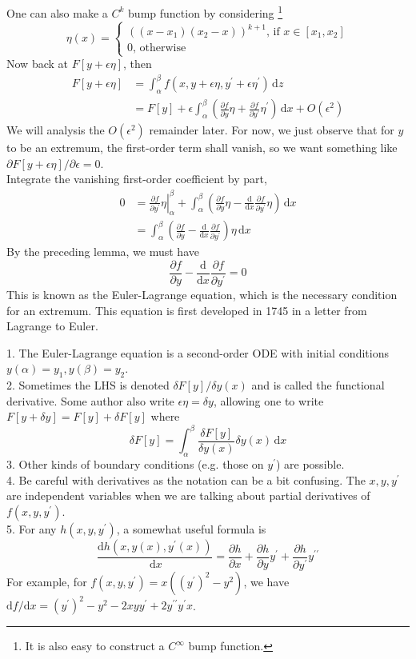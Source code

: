 One can also make a $C^k$ bump function by considering
\footnote{It is also easy to construct a $C^{\infty}$ bump function.}
$$\eta(x)=\begin{cases}
    ((x-x_1)(x_2-x))^{k+1}\text{, if $x\in [x_1,x_2]$}\\
    0\text{, otherwise}
\end{cases}$$
Now back at $F[y+\epsilon\eta]$, then
\begin{align*}
    F[y+\epsilon\eta]&=\int_\alpha^\beta f(x,y+\epsilon\eta,y^\prime+\epsilon\eta^\prime)\,\mathrm dz\\
    &=F[y]+\epsilon\int_\alpha^\beta\left( \frac{\partial f}{\partial y}\eta+\frac{\partial f}{\partial y^\prime}\eta^\prime \right)\,\mathrm dx+O(\epsilon^2)
\end{align*}
We will analysis the $O(\epsilon^2)$ remainder later.
For now, we just observe that for $y$ to be an extremum, the first-order term shall vanish, so we want something like $\partial F[y+\epsilon\eta]/\partial\epsilon=0$.\\
Integrate the vanishing first-order coefficient by part,
\begin{align*}
    0&=\left.\frac{\partial f}{\partial y^\prime}\eta\right|_\alpha^\beta+\int_\alpha^\beta\left( \frac{\partial f}{\partial y}\eta-\frac{\mathrm d}{\mathrm dx}\frac{\partial f}{\partial y^\prime}\eta \right)\,\mathrm dx\\
    &=\int_\alpha^\beta\left( \frac{\partial f}{\partial y}-\frac{\mathrm d}{\mathrm dx}\frac{\partial f}{\partial y^\prime} \right)\eta\,\mathrm dx
\end{align*}
By the preceding lemma, we must have
$$\frac{\partial f}{\partial y}-\frac{\mathrm d}{\mathrm dx}\frac{\partial f}{\partial y^\prime}=0$$
This is known as the Euler-Lagrange equation, which is the necessary condition for an extremum.
This equation is first developed in 1745 in a letter from Lagrange to Euler.
\begin{remark}
    1. The Euler-Lagrange equation is a second-order ODE with initial conditions $y(\alpha)=y_1,y(\beta)=y_2$.\\
    2. Sometimes the LHS is denoted $\delta F[y]/\delta y(x)$ and is called the functional derivative.
    Some author also write $\epsilon\eta=\delta y$, allowing one to write $F[y+\delta y]=F[y]+\delta F[y]$ where
    $$\delta F[y]=\int_\alpha^\beta\frac{\delta F[y]}{\delta y(x)}\delta y(x)\,\mathrm dx$$
    3. Other kinds of boundary conditions (e.g. those on $y^\prime$) are possible.\\
    4. Be careful with derivatives as the notation can be a bit confusing.
    The $x,y,y^\prime$ are independent variables when we are talking about partial derivatives of $f(x,y,y^\prime)$.\\
    5. For any $h(x,y,y^\prime)$, a somewhat useful formula is
    $$\frac{\mathrm dh(x,y(x),y^\prime(x))}{\,\mathrm dx}=\frac{\partial h}{\partial x}+\frac{\partial h}{\partial y}y^\prime+\frac{\partial h}{\partial y^\prime}y^{\prime\prime}$$
    For example, for $f(x,y,y^\prime)=x((y^\prime)^2-y^2)$, we have $\mathrm df/\mathrm dx=(y^\prime)^2-y^2-2xyy^\prime+2y^{\prime\prime}y^\prime x$.
\end{remark}
